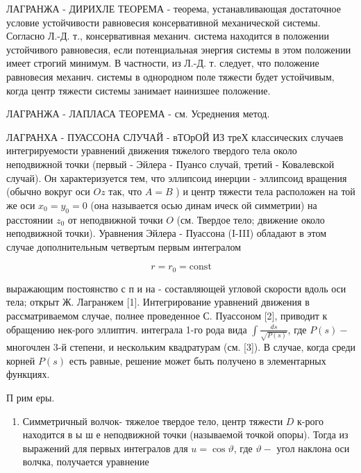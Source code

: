 \documentclass[10pt]{article}
\begin{document}
ЛАГРАНЖА - ДИРИХЛЕ ТЕОРЕМА - теорема, устанавливающая достаточное условие устойчивости равновесия консервативной механической системы. Согласно Л.-Д. т., консервативная механич. система находится в положении устойчивого равновесия, если потенциальная энергия системы в этом положении имеет строгий минимум. В частности, из Л.-Д. т. следует, что положение равновесия механич. системы в однородном поле тяжести будет устойчивым, когда центр тяжести системы занимает наинизшее положение.



ЛАГРАНЖА - ЛАПЛАСА ТЕОРЕМА - см. Усреднения метод.



ЛАГРАНХА - ПУАССОНА СЛУЧАЙ - вТОрОЙ ИЗ треХ классических случаев интегрируемости уравнений движения тяжелого твердого тела около неподвижной точки (первый - Эйлера - Пуансо случай, третий - Ковалевской случай). Он характеризуется тем, что эллипсоид инерции - эллипсоид вращения (обычно вокруг оси $O z$ так, что $A=B$ ) и центр тяжести тела расположен на той же оси $x_{0}=y_{0}=0$ (она называется осью динам ическ ой симметрии) на расстоянии $z_{0}$ от неподвижной точки $O$ (см. Твердое тело; движение около неподвижной точки). Уравнения Эйлера - Пуассона (I-III) обладают в этом случае дополнительным четвертым первым интегралом



\[

r=r_{0}=\mathrm{const}

\]



выражающим постоянство с п и на - составляющей угловой скорости вдоль оси тела; открыт Ж. Лагранжем [1]. Интегрирование уравнений движения в рассматриваемом случае, полнее проведенное С. Пуассоном [2], приводит к обращению нек-рого эллиптич. интеграла 1-го рода вида $\int \frac{d s}{\sqrt{P(s)}}$, где $P(s)-$ многочлен 3-й степени, и нескольким квадратурам (см. [3]). В случае, когда среди корней $P(s)$ есть равные, решение может быть получено в элементарных функциях.



П рим еры.



\begin{enumerate}

  \item Симметричный волчок- тяжелое твердое тело, центр тяжести $D$ к-рого находится в ы ш е неподвижной точки (называемой точкой опоры). Тогда из выражений для первых интегралов для $u=\cos \vartheta$, где $\vartheta-$ угол наклона оси волчка, получается уравнение

\end{enumerate}
\end{document}
